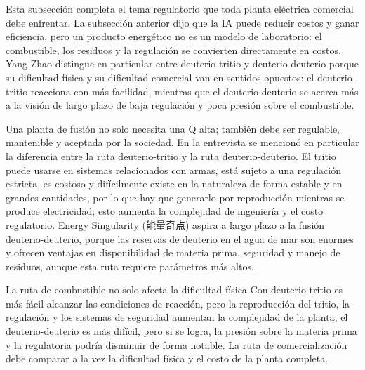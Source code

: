 \documentclass[a4paper]{article}
\begin{document}
Esta subsección completa el tema regulatorio que toda planta eléctrica comercial debe enfrentar. La subsección anterior dijo que la IA puede reducir costos y ganar eficiencia, pero un producto energético no es un modelo de laboratorio: el combustible, los residuos y la regulación se convierten directamente en costos. Yang Zhao distingue en particular entre deuterio-tritio y deuterio-deuterio porque su dificultad física y su dificultad comercial van en sentidos opuestos: el deuterio-tritio reacciona con más facilidad, mientras que el deuterio-deuterio se acerca más a la visión de largo plazo de baja regulación y poca presión sobre el combustible.

Una planta de fusión no solo necesita una Q alta; también debe ser regulable, mantenible y aceptada por la sociedad. En la entrevista se mencionó en particular la diferencia entre la ruta deuterio-tritio y la ruta deuterio-deuterio. El tritio puede usarse en sistemas relacionados con armas, está sujeto a una regulación estricta, es costoso y difícilmente existe en la naturaleza de forma estable y en grandes cantidades, por lo que hay que generarlo por reproducción mientras se produce electricidad; esto aumenta la complejidad de ingeniería y el costo regulatorio. Energy Singularity (能量奇点) aspira a largo plazo a la fusión deuterio-deuterio, porque las reservas de deuterio en el agua de mar son enormes y ofrecen ventajas en disponibilidad de materia prima, seguridad y manejo de residuos, aunque esta ruta requiere parámetros más altos.

\begin{warningbox}{La ruta de combustible no solo afecta la dificultad física}
Con deuterio-tritio es más fácil alcanzar las condiciones de reacción, pero la reproducción del tritio, la regulación y los sistemas de seguridad aumentan la complejidad de la planta; el deuterio-deuterio es más difícil, pero si se logra, la presión sobre la materia prima y la regulatoria podría disminuir de forma notable. La ruta de comercialización debe comparar a la vez la dificultad física y el costo de la planta completa.
\end{warningbox}
\end{document}
